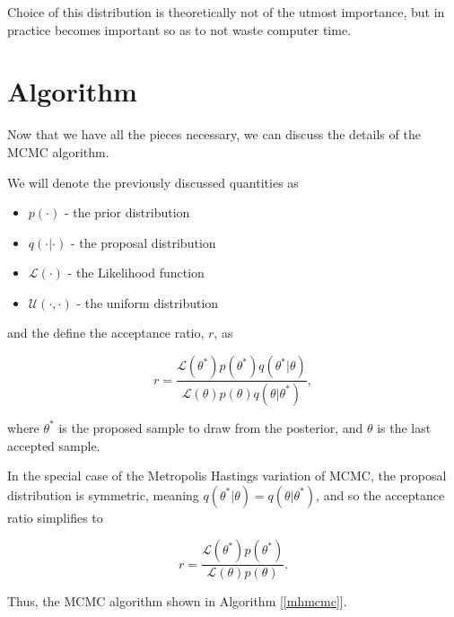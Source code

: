     Choice of this distribution is theoretically not of the utmost importance, but in practice becomes important so as to not waste computer time.


\section{Algorithm}

    Now that we have all the pieces necessary, we can discuss the details of the MCMC algorithm.

    We will denote the previously discussed quantities as

    \begin{itemize}
        \item $p(\cdot)$ - the prior distribution
        \item $q(\cdot|\cdot)$ - the proposal distribution
        \item $\mathcal{L}(\cdot)$ - the Likelihood function
        \item $\mathcal{U}(\cdot,\cdot)$ - the uniform distribution
    \end{itemize}

    and the define the acceptance ratio, $r$, as

    \begin{equation}
    	r = \frac{\mathcal{L}(\theta^*)p(\theta^*)q(\theta^*|\theta)}{\mathcal{L}(\theta)p(\theta)q(\theta|\theta^*)},
    \end{equation}

    where $\theta^*$ is the proposed sample to draw from the posterior, and $\theta$ is the last accepted sample.

    In the special case of the Metropolis Hastings variation of MCMC, the proposal distribution is symmetric, meaning $q(\theta^*|\theta) = q(\theta|\theta^*)$, and so the acceptance ratio simplifies to

    \begin{equation}
    	r = \frac{\mathcal{L}(\theta^*)p(\theta^*)}{\mathcal{L}(\theta)p(\theta)}.
    \end{equation}

    Thus, the MCMC algorithm shown in Algorithm [\ref{mhmcmc}].
    
